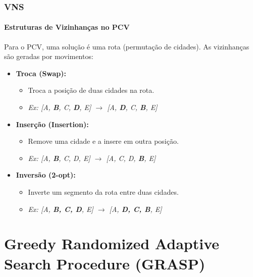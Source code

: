 \documentclass{beamer}
\begin{document}
\begin{frame}
  \frametitle{VNS}
  \framesubtitle{Estruturas de Vizinhanças no PCV}
  
  Para o PCV, uma solução é uma rota (permutação de cidades). As vizinhanças são geradas por movimentos:
  
  \begin{itemize}
    \item \textbf{Troca (Swap):}
    \begin{itemize}
      \item Troca a posição de duas cidades na rota.
      \item \textit{Ex: [A, \textbf{B}, C, \textbf{D}, E] $\rightarrow$ [A, \textbf{D}, C, \textbf{B}, E]}
    \end{itemize}
    \vspace{0.5cm}
    \item \textbf{Inserção (Insertion):}
    \begin{itemize}
      \item Remove uma cidade e a insere em outra posição.
      \item \textit{Ex: [A, \textbf{B}, C, D, E] $\rightarrow$ [A, C, D, \textbf{B}, E]}
    \end{itemize}
    \vspace{0.5cm}
    \item \textbf{Inversão (2-opt):}
    \begin{itemize}
      \item Inverte um segmento da rota entre duas cidades.
      \item \textit{Ex: [A, \textbf{B, C, D}, E] $\rightarrow$ [A, \textbf{D, C, B}, E]}
    \end{itemize}
  \end{itemize}
  
\end{frame}


\section{Greedy Randomized Adaptive Search Procedure (GRASP)}
\end{document}
